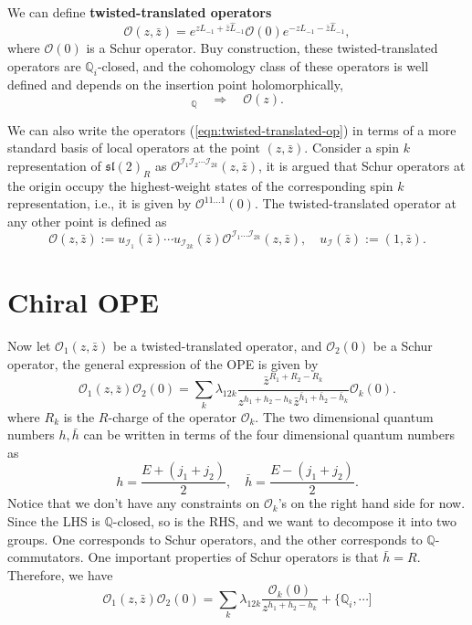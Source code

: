 \documentclass[a4paper,11pt]{article}
\begin{document}
We can define \textbf{twisted-translated operators}
\begin{equation}\label{eqn:twisted-translated-op}
    \mathcal{O}(z, \bar{z}) = e^{zL_{-1} + \bar{z} \widehat{L}_{-1}} \mathcal{O}(0) e^{-z L_{-1} - \bar{z} \widehat{L}_{-1}},
\end{equation}
where $\mathcal{O}(0)$ is a Schur operator. Buy construction, these twisted-translated operators are $\mathbb{Q}_i$-closed, and the cohomology class of these operators is well defined and depends on the insertion point holomorphically,
\begin{equation}
    [\mathcal{O}(z, \bar{z})]_{\mathbb{Q}} \quad \Rightarrow \quad \mathcal{O}(z).
\end{equation}

We can also write the operators (\ref{eqn:twisted-translated-op}) in terms of a more standard basis of local operators at the point $(z,\bar{z})$. Consider a spin $k$ representation of $\mathfrak{sl}(2)_R$ as $\mathcal{O}^{\mathcal{I}_1  \mathcal{I}_2 \cdots \mathcal{I}_{2k}}(z, \bar{z})$, it is argued that Schur operators at the origin occupy the highest-weight states of the corresponding spin $k$ representation, i.e., it is given by $\mathcal{O}^{11...1}(0)$. The twisted-translated operator at any other point is defined as
\begin{equation}
    \mathcal{O}(z, \bar{z}) := u_{\mathcal{I}_1}(\bar{z}) \cdots u_{\mathcal{I}_{2k}}(\bar{z}) \mathcal{O}^{\mathcal{I}_1 ... \mathcal{I}_{2k}}(z, \bar{z}), \quad u_{\mathcal{I}}(\bar{z}) := (1, \bar{z}).
\end{equation}

\section{Chiral OPE}
Now let $\mathcal{O}_1(z, \bar{z})$ be a twisted-translated operator, and $\mathcal{O}_2(0)$ be a Schur operator, the general expression of the OPE is given by
\begin{equation}
    \mathcal{O}_1(z, \bar{z}) \mathcal{O}_2(0) = \sum_k \lambda_{12k} \frac{\bar{z}^{R_1 + R_2 - R_k}}{z^{h_1 + h_2 - h_k} \bar{z}^{\bar{h}_1 + \bar{h}_2 - \bar{h}_k}}\mathcal{O}_k(0).
\end{equation}
where $R_k$ is the $R$-charge of the operator $\mathcal{O}_k$. The two dimensional quantum numbers $h, \bar{h}$ can be written in terms of the four dimensional quantum numbers as
\begin{equation}
    h = \frac{E + (j_1 + j_2)}{2}, \quad \bar{h} = \frac{E - (j_1 + j_2)}{2}.
\end{equation}
Notice that we don't have any constraints on $\mathcal{O}_k$'s on the right hand side for now. Since the LHS is $\mathbb{Q}$-closed, so is the RHS, and we want to decompose it into two groups. One corresponds to Schur operators, and the other corresponds to $\mathbb{Q}$-commutators. One important properties of Schur operators is that $\bar{h} = R$. Therefore, we have
\begin{equation}
    \mathcal{O}_1(z, \bar{z}) \mathcal{O}_2(0) = \sum_k \lambda_{12k} \frac{\mathcal{O}_k(0)}{z^{h_1 + h_2 - h_k}} + \{ \mathbb{Q}_i, \cdots ]
\end{equation}
\end{document}
